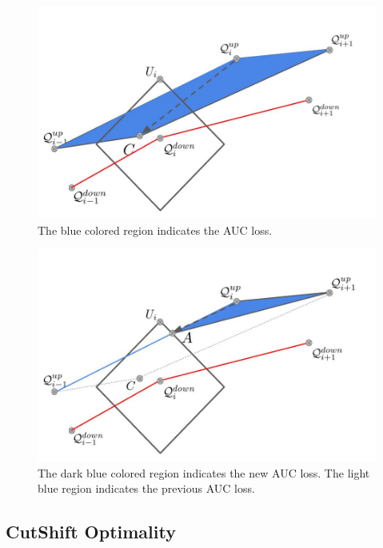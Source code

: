 \documentclass{article}
\begin{document}
\begin{figure}[!h]
    \centering
    \includegraphics[scale = 0.23]{diagrams/nNorm_proof1.jpg}
    \caption{The blue colored region indicates the AUC loss.}
    \label{fig:n1}
\end{figure}
\begin{figure}[!h]
    \centering
    \includegraphics[scale = 0.23]{diagrams/nNorm_proof2.jpg}
    \caption{The dark blue colored region indicates the new AUC loss. The light blue region indicates the previous AUC loss.}
    \label{fig:n2}
\end{figure}

\subsection{CutShift Optimality}
\end{document}
